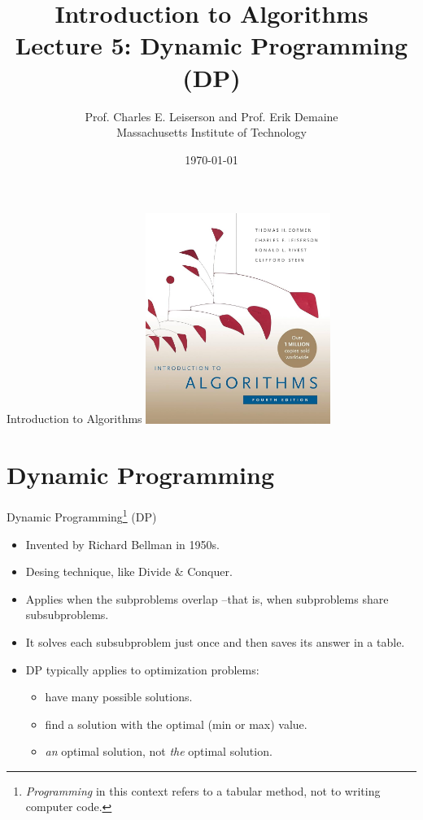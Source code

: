 \documentclass{beamer}
\title[L5 DP]{Introduction to Algorithms \\ Lecture 5: Dynamic Programming (DP)}
\author{Prof. Charles E. Leiserson and Prof. Erik Demaine \\ Massachusetts Institute of Technology}
\date{\today}
\begin{document}
\frame{\titlepage}

\begin{frame}{Introduction to Algorithms}
    \centering
    \includegraphics[width=0.45\textwidth]{figures/book_cover.jpg} \\
\end{frame}

\section{Dynamic Programming}

\begin{frame}{Dynamic Programming\footnote{\textit{Programming} in this context refers to a tabular method, not to writing computer code.} (DP)}
    \begin{itemize}
        \item Invented by Richard Bellman in 1950s.
        \item Desing technique, like Divide \& Conquer.
        \item Applies when the subproblems overlap --that is, when subproblems share subsubproblems.
        \item It solves each subsubproblem just once and then saves its answer in a table.
        \item DP typically applies to optimization problems:
        \begin{itemize}
            \item have many possible solutions.
            \item find a solution with the optimal (min or max) value.
            \item \textit{an} optimal solution, not \textit{the} optimal solution.
        \end{itemize}
    \end{itemize}
\end{frame}
\end{document}
